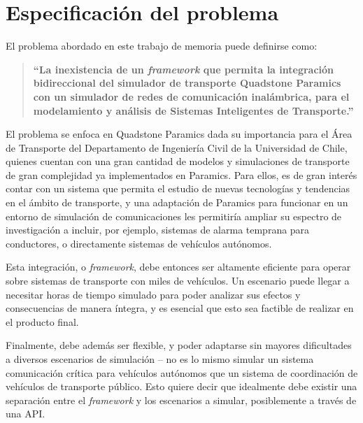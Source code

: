 \section{Especificación del problema}

El problema abordado en este trabajo de memoria puede definirse como: 
\begin{quote}
    \textbf{``La inexistencia de un \emph{framework} que permita la integración bidireccional del simulador de transporte Quadstone Paramics con un simulador de redes de comunicación inalámbrica, para el modelamiento y análisis de Sistemas Inteligentes de Transporte.''}
\end{quote}

El problema se enfoca en Quadstone Paramics dada su importancia para el Área de Transporte del Departamento de Ingeniería Civil de la Universidad de Chile, quienes cuentan con una gran cantidad de modelos y simulaciones de transporte de gran complejidad ya implementados en Paramics.
Para ellos, es de gran interés contar con un sistema que permita el estudio de nuevas tecnologías y tendencias en el ámbito de transporte, y una adaptación de Paramics para funcionar en un entorno de simulación de comunicaciones les permitiría ampliar su espectro de investigación a incluir, por ejemplo, sistemas de alarma temprana para conductores, o directamente sistemas de vehículos autónomos.

Esta integración, o \emph{framework}, debe entonces ser altamente eficiente para operar sobre sistemas de transporte con miles de vehículos. Un escenario puede llegar a necesitar horas de tiempo simulado para poder analizar sus efectos y consecuencias de manera íntegra, y es esencial que esto sea factible de realizar en el producto final.

Finalmente, debe además ser flexible, y poder adaptarse sin mayores dificultades a diversos escenarios de simulación -- no es lo mismo simular un sistema comunicación crítica para vehículos autónomos que un sistema de coordinación de vehículos de transporte público. Esto quiere decir que idealmente debe existir una separación entre el \emph{framework} y los escenarios a simular, posiblemente a través de una API.
